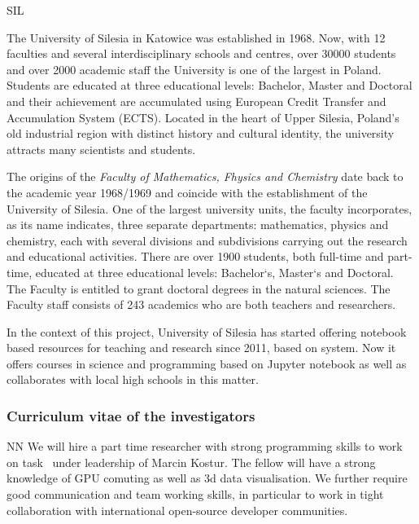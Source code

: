 \begin{sitedescription}{SIL}\label{desc:SIL}

The University of Silesia in Katowice was established in 1968. Now,
with 12 faculties and several interdisciplinary schools and centres,
over 30000 students and over 2000 academic staff the University is one
of the largest in Poland. Students are educated at three educational
levels: Bachelor, Master and Doctoral and their achievement are
accumulated using European Credit Transfer and Accumulation System
(ECTS). Located in the heart of Upper Silesia, Poland's old industrial
region with distinct history and cultural identity, the university
attracts many scientists and students.

The origins of the {\em Faculty of Mathematics, Fhysics and Chemistry} date
back to the academic year 1968/1969 and coincide with the
establishment of the University of Silesia. One of the largest
university units, the faculty incorporates, as its name indicates,
three separate departments: mathematics, physics and chemistry, each
with several divisions and subdivisions carrying out the research and
educational activities. There are over 1900 students, both full-time
and part-time, educated at three educational levels: Bachelor`s,
Master`s and Doctoral. The Faculty is entitled to grant doctoral
degrees in the natural sciences. The Faculty staff consists of 243
academics who are both teachers and researchers.


In the context of this project, University of Silesia has started offering notebook based resources for teaching and research since 2011, based on \Sage system. Now it offers courses in science and programming based on Jupyter notebook as well as collaborates with local high schools in this matter. 


\subsubsection*{Curriculum vitae of the investigators}




\begin{participant}[type=res,PM=15,salary=2500]{NN}
    We will hire a part time researcher with strong programming skills to work on task~ under leadership of Marcin Kostur. 
The fellow will have a strong knowledge of GPU comuting as well as 3d data visualisation. 
We further require good communication and team working skills, in particular to work in tight collaboration with international open-source developer communities.
\end{participant}


\end{sitedescription}
